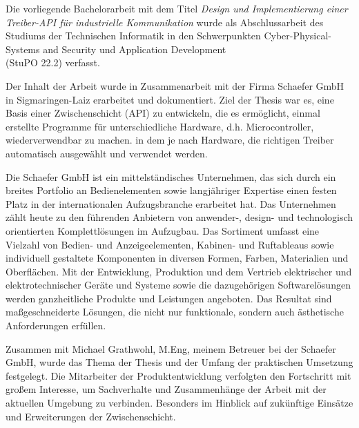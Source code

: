 Die vorliegende Bachelorarbeit mit dem Titel \textit{Design und Implementierung einer Treiber-API für industrielle Kommunikation} wurde als Abschlussarbeit des Studiums der Technischen Informatik in den Schwerpunkten Cyber-Physical-Systems and Security und Application Development\\ (StuPO 22.2) verfasst.

Der Inhalt der Arbeit wurde in Zusammenarbeit mit der Firma Schaefer GmbH in Sigmaringen-Laiz erarbeitet und dokumentiert.
Ziel der Thesis war es, eine Basis einer Zwischenschicht (API) zu entwickeln, die es ermöglicht, einmal erstellte Programme für unterschiedliche Hardware, d.h. Microcontroller, wiederverwendbar zu machen. in dem je nach Hardware, die richtigen Treiber automatisch ausgewählt und verwendet werden.

Die Schaefer GmbH ist ein mittelständisches Unternehmen, das sich durch ein breites Portfolio an Bedienelementen sowie langjähriger Expertise einen festen Platz in der internationalen Aufzugsbranche erarbeitet hat. 
Das Unternehmen zählt heute zu den führenden Anbietern von anwender-, design- und technologisch orientierten Komplettlösungen im Aufzugbau.
Das Sortiment umfasst eine Vielzahl von Bedien- und Anzeigeelementen, Kabinen- und Ruftableaus sowie individuell gestaltete Komponenten in diversen Formen, Farben, Materialien und Oberflächen. 
Mit der Entwicklung, Produktion und dem Vertrieb elektrischer und elektrotechnischer Geräte und Systeme sowie die dazugehörigen Softwarelösungen werden ganzheitliche Produkte und Leistungen angeboten.
Das Resultat sind maßgeschneiderte Lösungen, die nicht nur funktionale, sondern auch ästhetische Anforderungen erfüllen. 

Zusammen mit Michael Grathwohl, M.Eng, meinem Betreuer bei der Schaefer GmbH, wurde das Thema der Thesis und der Umfang der praktischen Umsetzung festgelegt.
Die Mitarbeiter der Produktentwicklung verfolgten den Fortschritt mit großem Interesse, um Sachverhalte und Zusammenhänge der Arbeit mit der aktuellen Umgebung zu verbinden.
Besonders im Hinblick auf zukünftige Einsätze und Erweiterungen der Zwischenschicht.

